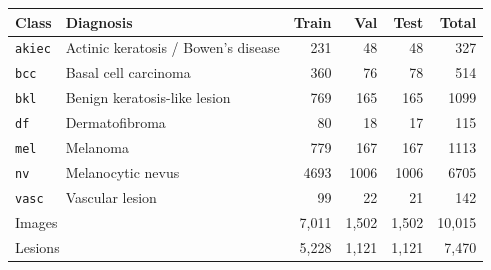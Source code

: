 \begin{tabular}{llrrrr}
\toprule
Class & Diagnosis & Train & Val & Test & Total \\
\midrule
\texttt{akiec} & Actinic keratosis / Bowen's disease & 231 & 48 & 48 & 327 \\
\texttt{bcc} & Basal cell carcinoma & 360 & 76 & 78 & 514 \\
\texttt{bkl} & Benign keratosis-like lesion & 769 & 165 & 165 & 1099 \\
\texttt{df} & Dermatofibroma & 80 & 18 & 17 & 115 \\
\texttt{mel} & Melanoma & 779 & 167 & 167 & 1113 \\
\texttt{nv} & Melanocytic nevus & 4693 & 1006 & 1006 & 6705 \\
\texttt{vasc} & Vascular lesion & 99 & 22 & 21 & 142 \\
\midrule
\multicolumn{2}{l}{Images} & 7,011 & 1,502 & 1,502 & 10,015 \\
\multicolumn{2}{l}{Lesions} & 5,228 & 1,121 & 1,121 & 7,470 \\
\bottomrule
\end{tabular}
